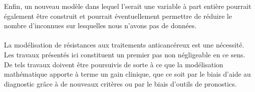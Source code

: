 \documentclass[main.tex]{subfiles}
\begin{document}
Enfin, un nouveau modèle dans lequel l'\hetero serait une variable à part entière pourrait également être construit et pourrait éventuellement permettre de réduire le nombre d'inconnues sur lesquelles nous n'avons pas de données.

\paragraph{}
La modélisation de résistances aux traitements anticancéreux est une nécessité. Les travaux présentés ici constituent un premier pas non négligeable en ce sens. 
De tels travaux doivent être poursuivis de sorte à ce que la modélisation mathématique apporte à terme un gain clinique, que ce soit par le biais d'aide au diagnostic grâce à de nouveaux critères ou par le biais d'outils de pronostics. %
\end{document}
